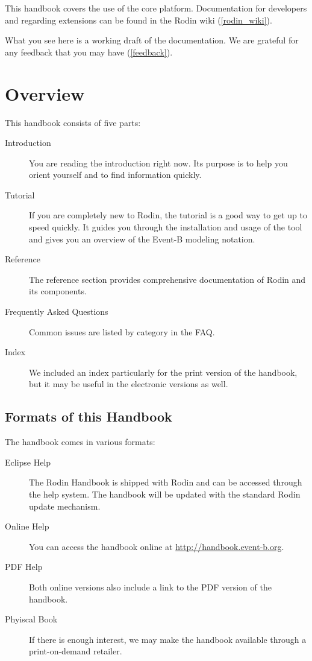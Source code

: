 \documentclass[12pt]{book}
\begin{document}
This handbook covers the use of the core platform.  Documentation for developers and regarding extensions can be found in the Rodin wiki (\ref{rodin_wiki}).

What you see here is a working draft of the documentation.  We are grateful for any feedback that you may have (\ref{feedback}).

\section{Overview}

This handbook consists of five parts:

\begin{description}
	\item[Introduction] You are reading the introduction right now.  Its purpose is to help you orient yourself and to find information quickly.
	\item[Tutorial] If you are completely new to Rodin, the tutorial is a good way to get up to speed quickly.  It guides you through the installation and usage of the tool and gives you an overview of the Event-B modeling notation.
	\item[Reference] The reference section provides comprehensive documentation of Rodin and its components.
	\item[Frequently Asked Questions] Common issues are listed by category in the FAQ.
	\item[Index] We included an index particularly for the print version of the handbook, but it may be useful in the electronic versions as well.  
\end{description}

\subsection{Formats of this Handbook}
\label{handbook_formats}

The handbook comes in various formats:

\begin{description}
	\item[Eclipse Help] The Rodin Handbook is shipped with Rodin and can be accessed through the help system.  The handbook will be updated with the standard Rodin update mechanism.
	\item[Online Help] You can access the handbook online at \url{http://handbook.event-b.org}.
	\item[PDF Help] Both online versions also include a link to the PDF version of the handbook.
	\item[Phyiscal Book] If there is enough interest, we may make the handbook available through a print-on-demand retailer.
\end{description}
\end{document}
